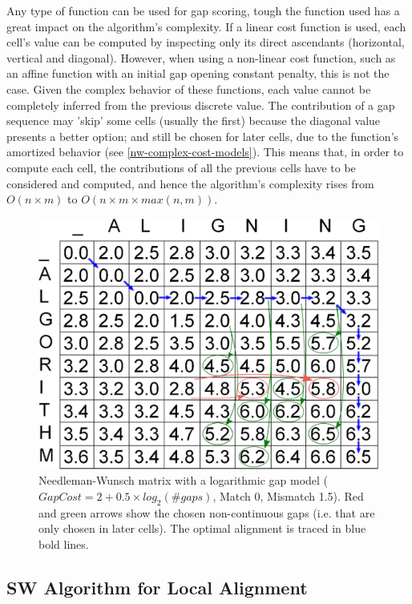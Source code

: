 Any type of function can be used for gap scoring, tough the function used has a great impact on the algorithm's complexity. If a linear cost function is used, each cell's value can be computed by inspecting only its direct ascendants (horizontal, vertical and diagonal). However, when using a non-linear cost function, such as an affine function with an initial gap opening constant penalty, this is not the case. Given the complex behavior of these functions, each value cannot be completely inferred from the previous discrete value. The contribution of a gap sequence may 'skip' some cells (usually the first) because the diagonal value presents a better option; and still be chosen for later cells, due to the function's amortized behavior (see \autoref{nw-complex-cost-models}). This means that, in order to compute each cell, the contributions of all the previous cells have to be considered and computed, and hence the algorithm's complexity rises from $O(n \times  m)$ to $O(n \times m \times max(n,m))$. 

\begin{figure}[htb!]
\centering
\includegraphics[scale=0.6]{img-align/nw-complex-cost-models.eps}
\caption[Needleman-Wunsch alignment] {Needleman-Wunsch matrix with a logarithmic gap model ($GapCost = 2 + 0.5 \times log_2(\#gaps)$, Match 0, Mismatch 1.5). Red and green arrows show the chosen non-continuous gaps (i.e. that are only chosen in later cells). The optimal alignment is traced in blue bold lines.}
\label{nw-complex-cost-models}
\end{figure}



\subsection{\ac{SW} Algorithm for Local Alignment}
\label{Smith-Waterman algorithm for Local Alignment}

